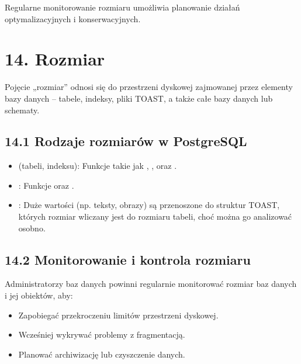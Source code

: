 \documentclass[a4paper,11pt,polish]{sphinxmanual}
\begin{document}
\sphinxAtStartPar
Regularne monitorowanie rozmiaru umożliwia planowanie działań optymalizacyjnych i konserwacyjnych.


\section{14. Rozmiar}
\label{\detokenize{Konfiguracja_baz_danych/Konfiguracja_baz_danych:rozmiar}}
\sphinxAtStartPar
Pojęcie „rozmiar” odnosi się do przestrzeni dyskowej zajmowanej przez elementy bazy danych – tabele, indeksy, pliki TOAST, a także całe bazy danych lub schematy.


\subsection{14.1 Rodzaje rozmiarów w PostgreSQL}
\label{\detokenize{Konfiguracja_baz_danych/Konfiguracja_baz_danych:rodzaje-rozmiarow-w-postgresql}}\begin{itemize}
\item {} 
\sphinxAtStartPar
{} (tabeli, indeksu):
Funkcje takie jak , ,  oraz .

\item {} 
\sphinxAtStartPar
{}:
Funkcje  oraz .

\item {} 
\sphinxAtStartPar
{}:
Duże wartości (np. teksty, obrazy) są przenoszone do struktur TOAST, których rozmiar wliczany jest do rozmiaru tabeli, choć można go analizować osobno.

\end{itemize}


\subsection{14.2 Monitorowanie i kontrola rozmiaru}
\label{\detokenize{Konfiguracja_baz_danych/Konfiguracja_baz_danych:monitorowanie-i-kontrola-rozmiaru}}
\sphinxAtStartPar
Administratorzy baz danych powinni regularnie monitorować rozmiar baz danych i jej obiektów, aby:
\begin{itemize}
\item {} 
\sphinxAtStartPar
Zapobiegać przekroczeniu limitów przestrzeni dyskowej.

\item {} 
\sphinxAtStartPar
Wcześniej wykrywać problemy z fragmentacją.

\item {} 
\sphinxAtStartPar
Planować archiwizację lub czyszczenie danych.

\end{itemize}
\end{document}
